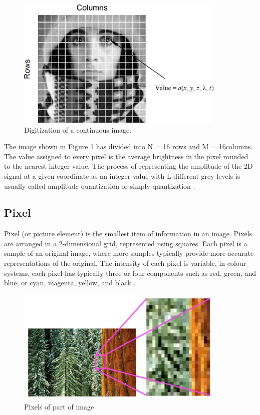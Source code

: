         \begin{figure}[h]
                \centering
                \includegraphics[width=10cm]{chapiter1/figures/degital-image.png}
                \setlength{\fboxrule}{2pt}
                \caption{Digitization of a continuous image\cite{1.1}.}
                \label{fig:figure1.1}
        \end{figure}

\hspace{-0.6cm}The image shown in Figure 1 has divided into N = 16 rows and M = 16columns.
The value assigned to every pixel is the average brightness in the pixel rounded to the nearest integer value.
The process of representing the amplitude of the 2D signal at a given coordinate as an integer value with 
L different grey levels is usually called amplitude quantization or simply quantization \cite{1.1}.

\subsection{Pixel}\label{subsec:pixel}

Pixel (or picture element) is the smallest item of information in an image.
Pixels are arranged in a 2-dimensional grid, represented using squares.
Each pixel is a sample of an original image, where more samples typically provide more-accurate representations of the original.
The intensity of each pixel is variable, in colour systems, each pixel has typically three or four 
components such as red, green, and blue, or cyan, magenta, yellow, and black \cite{1.2}.

        \begin{figure}[h]
                \centering
                \includegraphics[width=10cm]{chapiter1/figures/pixel.png}
                \setlength{\fboxrule}{2pt}
                \caption{Pixels of part of image}
                \label{fig:figure1.2}
        \end{figure}

